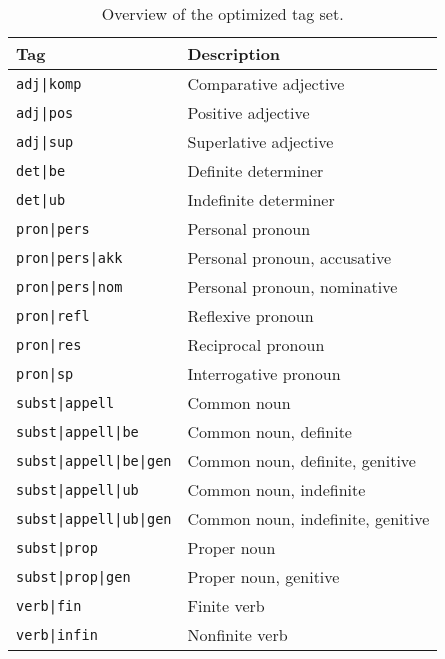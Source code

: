 \documentclass[11pt,a4paper]{article}
\begin{document}
\begin{table}
    \centering
    \smaller[1]
    \begin{tabular}{@{}ll@{}}
        \toprule
        \textbf{Tag} & \textbf{Description} \\
        \midrule
        \texttt{adj|komp} & Comparative adjective \\
        \texttt{adj|pos} & Positive adjective \\
        \texttt{adj|sup} & Superlative adjective \\
        \texttt{det|be} & Definite determiner \\
        \texttt{det|ub} & Indefinite determiner \\
        \texttt{pron|pers} & Personal pronoun \\
        \texttt{pron|pers|akk} & Personal pronoun, accusative \\
        \texttt{pron|pers|nom} & Personal pronoun, nominative \\
        \texttt{pron|refl} & Reflexive pronoun \\
        \texttt{pron|res} & Reciprocal pronoun \\
        \texttt{pron|sp} & Interrogative pronoun \\
        \texttt{subst|appell} & Common noun \\
        \texttt{subst|appell|be} & Common noun, definite \\
        \texttt{subst|appell|be|gen} & Common noun, definite, genitive \\
        \texttt{subst|appell|ub} & Common noun, indefinite \\
        \texttt{subst|appell|ub|gen} & Common noun, indefinite, genitive \\
        \texttt{subst|prop} & Proper noun \\
        \texttt{subst|prop|gen} & Proper noun, genitive \\
        \texttt{verb|fin} & Finite verb \\
        \texttt{verb|infin} & Nonfinite verb \\
        \bottomrule
    \end{tabular}
    \caption{Overview of the optimized tag set.}
    \label{optimizedtagset}
\end{table}
\end{document}
